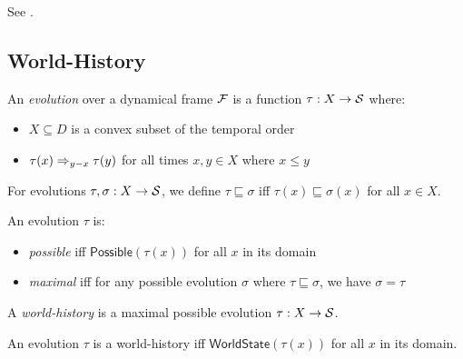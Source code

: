 \documentclass[../LogosReference.tex]{subfiles}
\begin{document}
\noindent
See .


\subsection{World-History}\label{sec:world-history}

\begin{definition}[Evolution]\label{def:evolution}
An \emph{evolution} over a dynamical frame $\mathcal{F}$ is a function $\tau : X \to \mathcal{S}$ where:
\begin{itemize}
    \item $X \subseteq D$ is a convex subset of the temporal order
    \item $\tau(x) \Rightarrow_{y-x} \tau(y)$ for all times $x, y \in X$ where $x \leq y$
\end{itemize}
\end{definition}

\begin{definition}\label{def:evolution-parthood}
For evolutions $\tau, \sigma : X \to \mathcal{S}$, we define $\tau \sqsubseteq \sigma$ iff $\tau(x) \sqsubseteq \sigma(x)$ for all $x \in X$.
\end{definition}

\begin{definition}\label{def:maximal-evolution}
An evolution $\tau$ is:
\begin{itemize}
    \item \emph{possible} iff $\mathsf{Possible}(\tau(x))$ for all $x$ in its domain
    \item \emph{maximal} iff for any possible evolution $\sigma$ where $\tau \sqsubseteq \sigma$, we have $\sigma = \tau$
\end{itemize}
\end{definition}

\begin{definition}\label{def:world-history}
A \emph{world-history} is a maximal possible evolution $\tau : X \to \mathcal{S}$.
\end{definition}

\begin{theorem}[Containment]\label{thm:containment}
An evolution $\tau$ is a world-history iff $\mathsf{WorldState}(\tau(x))$ for all $x$ in its domain.
\end{theorem}
\end{document}
